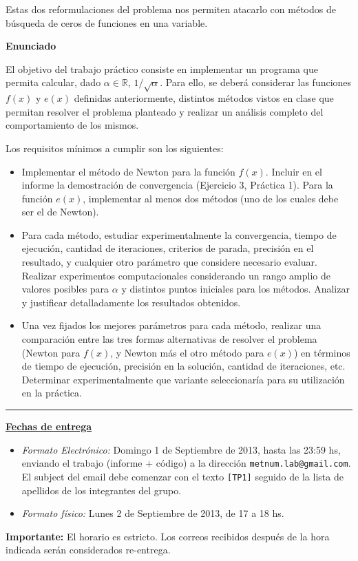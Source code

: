 Estas dos reformulaciones del problema nos permiten atacarlo con m\'etodos de b\'usqueda de ceros de funciones en una
variable.

\textbf{Enunciado}

El objetivo del trabajo pr\'actico consiste en implementar un programa que permita calcular, dado $\alpha \in
\mathbb{R}$, $1/\sqrt{\alpha}$. Para ello, se deber\'a considerar las funciones $f(x)$ y $e(x)$ definidas
anteriormente, distintos m\'etodos vistos en clase que permitan resolver el problema planteado y realizar un an\'alisis
completo del comportamiento de los mismos. 

Los requisitos m\'inimos a cumplir son los siguientes:

\begin{itemize}
\item Implementar el m\'etodo de Newton para la funci\'on $f(x)$. Incluir en el informe la demostraci\'on de
convergencia (Ejercicio 3, Pr\'actica 1). Para la funci\'on $e(x)$, implementar al menos dos m\'etodos (uno de los
cuales debe ser el de Newton).   
\item Para cada m\'etodo, estudiar experimentalmente la convergencia, tiempo de ejecuci\'on, cantidad de iteraciones,
criterios de parada, precisi\'on en el resultado, y cualquier otro par\'ametro que considere necesario evaluar. Realizar experimentos
computacionales considerando un rango amplio de valores posibles para $\alpha$ y distintos puntos iniciales
para los m\'etodos. Analizar y justificar detalladamente los resultados obtenidos.
\item Una vez fijados los mejores par\'ametros para cada m\'etodo, realizar una comparaci\'on entre las tres formas
alternativas de resolver el problema (Newton para $f(x)$, y Newton m\'as el otro m\'etodo para $e(x)$) en t\'erminos de
tiempo de ejecuci\'on, precisi\'on en la soluci\'on, cantidad de iteraciones, etc. Determinar experimentalmente que
variante seleccionar\'ia para su utilizaci\'on en la pr\'actica.
\end{itemize}

\vskip 15pt

\hrule

\vskip 11pt


{\bf \underline{Fechas de entrega}}
\begin{itemize}
 \item \emph{Formato Electr\'onico:} Domingo 1 de Septiembre de 2013, hasta las 23:59 hs, enviando el trabajo (informe +
 c\'odigo) a la direcci\'on \verb+metnum.lab@gmail.com+. El subject del email debe comenzar con el texto \verb+[TP1]+
 seguido de la lista de apellidos  de los integrantes del grupo.
 \item \emph{Formato f\'isico:} Lunes 2 de Septiembre de 2013, de 17 a 18 hs.
\end{itemize}

\noindent \textbf{Importante:} El horario es estricto. Los correos recibidos despu\'es de la hora indicada ser\'an considerados re-entrega.
